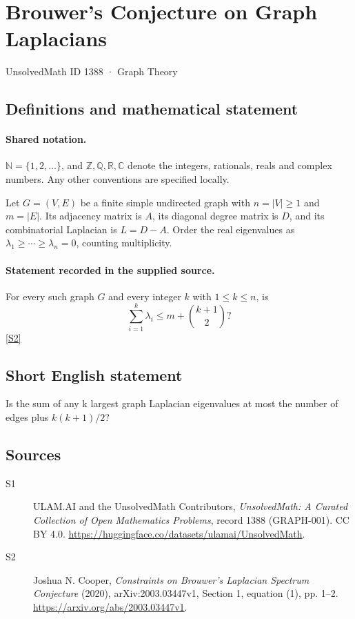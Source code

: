 \documentclass[11pt]{article}
\newcommand{\sref}[2]{\hyperlink{source:#1:#2}{[S#2]}}
\begin{document}
\setcounter{section}{1387}
\section{Brouwer's Conjecture on Graph Laplacians}\label{1388}
{\small\sffamily UnsolvedMath ID 1388 · Graph Theory}
\subsection{Definitions and mathematical statement}

\paragraph{Shared notation.}$\mathbb N=\{1,2,\ldots\}$, and $\mathbb Z,\mathbb Q,\mathbb R,\mathbb C$ denote the integers, rationals, reals and complex numbers. Any other conventions are specified locally.


Let $G=(V,E)$ be a finite simple undirected graph with $n=|V|\ge1$ and $m=|E|$. Its adjacency matrix is $A$, its diagonal degree matrix is $D$, and its combinatorial Laplacian is $L=D-A$. Order the real eigenvalues as $\lambda_1\ge\cdots\ge\lambda_n=0$, counting multiplicity.
\paragraph{Statement recorded in the supplied source.}
For every such graph $G$ and every integer $k$ with $1\le k\le n$, is
\[
 \sum_{i=1}^k\lambda_i\le m+\binom{k+1}{2}?
\]
\sref{1388}{2}
\subsection{Short English statement}
Is the sum of any k largest graph Laplacian eigenvalues at most the number of edges plus $k(k+1)/2$?
\subsection{Sources}
\begin{description}
\item[\hypertarget{source:1388:1}{S1}] ULAM.AI and the UnsolvedMath Contributors, \emph{UnsolvedMath: A Curated Collection of Open Mathematics Problems}, record 1388 (GRAPH-001). CC BY 4.0. \url{https://huggingface.co/datasets/ulamai/UnsolvedMath}.
\item[\hypertarget{source:1388:2}{S2}] Joshua N. Cooper, \emph{Constraints on Brouwer's Laplacian Spectrum Conjecture} (2020), arXiv:2003.03447v1, Section 1, equation (1), pp. 1--2. \url{https://arxiv.org/abs/2003.03447v1}.
\end{description}
\label{end:1388}
\end{document}
